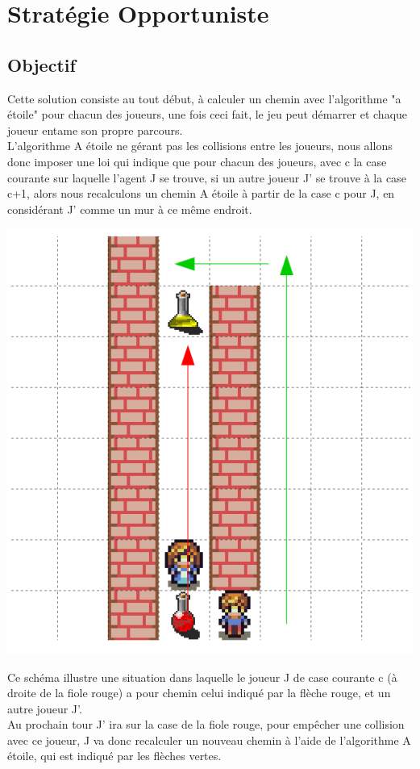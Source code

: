 \documentclass{article}
\begin{document}
\section{Stratégie Opportuniste}
	\subsection{Objectif}
		Cette solution consiste au tout début, à calculer un chemin avec
		l'algorithme "a étoile" pour chacun des joueurs, une fois ceci fait, le jeu peut démarrer et chaque joueur entame son propre parcours.\\ 
L'algorithme A étoile ne gérant pas les collisions entre les joueurs, nous allons donc imposer une loi qui indique que pour chacun des joueurs, avec c la case courante sur laquelle l'agent J se trouve, si un autre joueur J' se trouve à la case c+1, alors nous recalculons un chemin A étoile à partir de la case c pour J, en considérant J' comme un mur à ce même endroit.

	\includegraphics[scale=0.5]{Solution1_ex.png}

	Ce schéma illustre une situation dans laquelle le joueur J de case courante c (à droite de la fiole rouge) a pour chemin celui indiqué par la flèche rouge, et un autre joueur J'.\\
	Au prochain tour J' ira sur la case de la fiole rouge, pour empêcher une collision avec ce joueur, J va donc recalculer un nouveau chemin à l'aide de l'algorithme A étoile, qui est indiqué par les flèches vertes.
\end{document}
